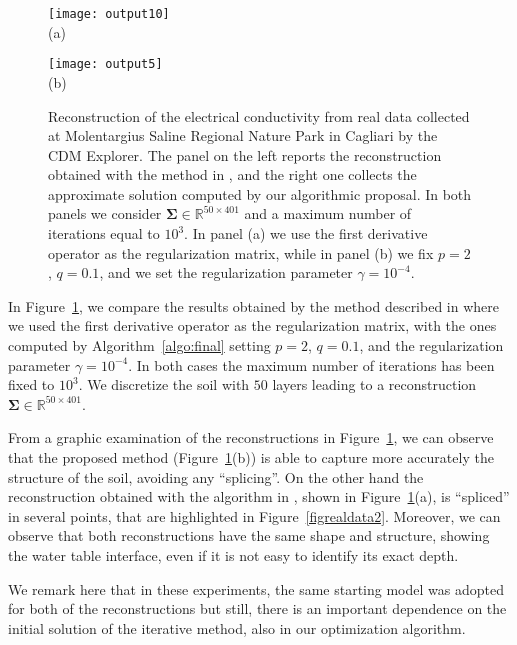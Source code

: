 \documentclass[final,leqno]{siamltex}
\newcommand{\R}{{\mathbb R}}
\newcommand{\Sigmab}{\mathbf{\Sigma}}
\begin{document}
\begin{figure}
\centering
\begin{minipage}{0.45\linewidth}
	\centering
	\texttt{[image: output10]}\\(a)
\end{minipage}
\begin{minipage}{0.45\linewidth}
	\centering
	\texttt{[image: output5]}\\(b)
\end{minipage}
\caption{Reconstruction of the electrical conductivity from real data collected at Molentargius Saline Regional Nature Park in Cagliari by the CDM Explorer. The panel on the left reports the reconstruction obtained with the method in \cite{ddrv19}, and the right one collects the approximate solution computed by our algorithmic proposal. In both panels we consider $\Sigmab\in\R^{50\times 401}$ and a maximum number of iterations equal to $10^3$. In panel (a) we use the first derivative operator as the regularization matrix, while in panel (b) we fix $p=2$, $q=0.1$, and we set the regularization parameter $\gamma = 10^{-4}$.}
\label{figrealdata}
\end{figure}

In Figure~\ref{figrealdata}, we compare the results obtained by the method described in \cite{ddrv19} where we used the first derivative operator as the regularization matrix, with the ones computed by Algorithm~\ref{algo:final} setting $p=2$, $q=0.1$, and the regularization parameter $\gamma = 10^{-4}$. In both cases the maximum number of iterations has been fixed to $10^3$. We discretize the soil with $50$ layers leading to a reconstruction $\Sigmab\in\R^{50 \times 401}$. 

From a graphic examination of the reconstructions in Figure~\ref{figrealdata}, we can observe that the proposed method (Figure~\ref{figrealdata}(b)) is able to capture more accurately the structure of the soil, avoiding any ``splicing''. On the other hand the reconstruction obtained with the algorithm in \cite{ddrv19}, shown in Figure~\ref{figrealdata}(a), is ``spliced'' in several points, that are highlighted in Figure~\ref{figrealdata2}. Moreover, we can observe that both reconstructions have the same shape and structure, showing the water table interface, even if it is not easy to identify its exact depth.

We remark here that in these experiments, the same starting model was adopted for both of the reconstructions but still, there is an important dependence on the initial solution of the iterative method, also in our optimization algorithm.
\end{document}

